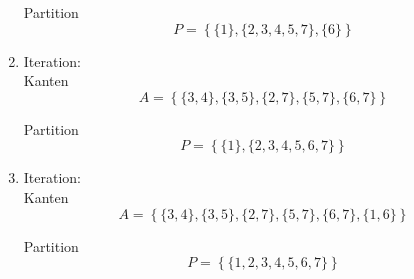 \documentclass[a4paper]{scrartcl}
\begin{document}
\begin{enumerate}
        Partition
        \begin{equation}
            P = \left\{
                \{ 1 \},
                \{ 2, 3, 4, 5, 7 \},
                \{ 6 \}
            \right\}
        \end{equation}
        
    \item Iteration:\\
        Kanten
        \begin{equation}
            A = \left\{
                \{ 3,4 \},
                \{ 3,5 \},
                \{ 2,7 \},
                \{ 5,7 \},
                \{ 6,7 \}
            \right\}
        \end{equation}
        
        Partition
        \begin{equation}
            P = \left\{
                \{ 1 \},
                \{ 2, 3, 4, 5, 6, 7 \}
            \right\}
        \end{equation}
        
    \item Iteration:\\
        Kanten
        \begin{equation}
            A = \left\{
                \{ 3, 4 \},
                \{ 3, 5 \},
                \{ 2, 7 \},
                \{ 5, 7 \},
                \{ 6, 7 \},
                \{ 1, 6 \}
            \right\}
        \end{equation}
        
        Partition
        \begin{equation}
            P = \left\{
                \{ 1, 2, 3, 4, 5, 6, 7 \}
            \right\}
        \end{equation}
        

\end{enumerate}
\end{document}
